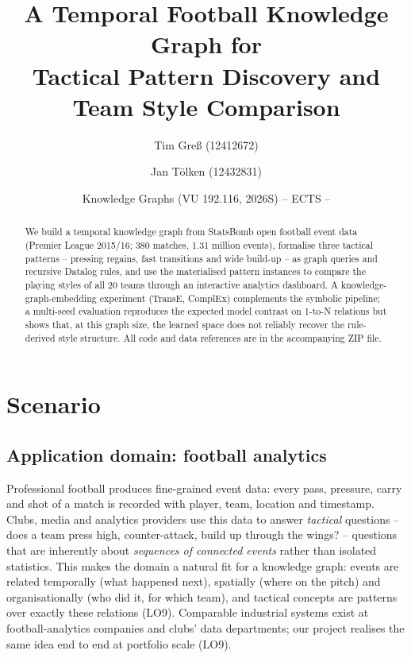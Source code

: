 \documentclass[11pt,a4paper]{article}
\title{A Temporal Football Knowledge Graph for\\
       Tactical Pattern Discovery and Team Style Comparison}
\author{Tim Gre\ss{} (12412672) \and Jan T\"olken (12432831)}
\date{Knowledge Graphs (VU 192.116, 2026S) \quad--\quad 6 ECTS
      \quad--\quad [TODO date]}
\begin{document}
\maketitle


\begin{abstract}
\noindent
We build a temporal knowledge graph from StatsBomb open football event data
(Premier League 2015/16; 380 matches, 1.31 million events), formalise three
tactical patterns -- pressing regains, fast transitions and wide build-up -- as
graph queries and recursive Datalog rules, and use the materialised pattern
instances to compare the playing styles of all 20 teams through an interactive
analytics dashboard. A knowledge-graph-embedding experiment (TransE, ComplEx)
complements the symbolic pipeline; a multi-seed evaluation reproduces the
expected model contrast on 1-to-N relations but shows that, at this graph size,
the learned space does not reliably recover the rule-derived style structure.
All code and data references are in the accompanying ZIP file.
\end{abstract}

\section{Scenario}

\subsection{Application domain: football analytics}

Professional football produces fine-grained event data: every pass, pressure,
carry and shot of a match is recorded with player, team, location and timestamp.
Clubs, media and analytics providers use this data to answer \emph{tactical}
questions -- does a team press high, counter-attack, build up through the wings?
-- questions that are inherently about \emph{sequences of connected events}
rather than isolated statistics. This makes the domain a natural fit for a
knowledge graph: events are related temporally (what happened next), spatially
(where on the pitch) and organisationally (who did it, for which team), and
tactical concepts are patterns over exactly these relations (LO9). Comparable
industrial systems exist at football-analytics companies and clubs' data
departments; our project realises the same idea end to end at portfolio scale
(LO9).
\end{document}

